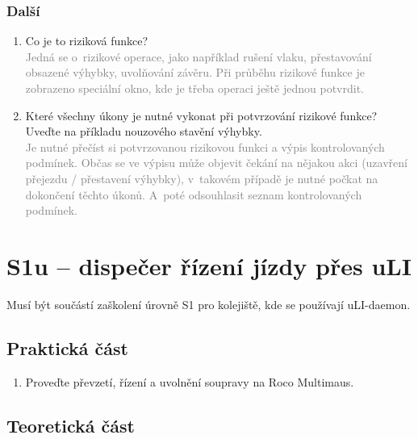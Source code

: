 \documentclass[12pt,a4paper]{article}
\newcommand{\solution}[1]{\\ \textcolor{gray}{#1}}
\newcommand{\solution}[1]{}
\begin{document}
\subsubsection*{Další}
\begin{enumerate}[leftmargin=*]
\item Co je to riziková funkce?
\solution{Jedná se o~rizikové operace, jako například rušení vlaku,
přestavování obsazené výhybky, uvolňování závěru. Při průběhu rizikové funkce
je zobrazeno speciální okno, kde je třeba operaci ještě jednou potvrdit.}

\item Které všechny úkony je nutné vykonat při potvrzování rizikové funkce?
Uveďte na příkladu nouzového stavění výhybky.
\solution{Je nutné přečíst si potvrzovanou rizikovou funkci a výpis
kontrolovaných podmínek. Občas se ve výpisu může objevit čekání na nějakou
akci (uzavření přejezdu / přestavení výhybky), v~takovém případě je nutné
počkat na dokončení těchto úkonů. A~poté odsouhlasit seznam kontrolovaných
podmínek.}

\end{enumerate}


\newpage
\section{S1u – dispečer řízení jízdy přes uLI}

Musí být součástí zaškolení úrovně S1 pro kolejiště, kde se používají
uLI-daemon.

\subsection{Praktická část}

\begin{enumerate}[leftmargin=*]
\item Proveďte převzetí, řízení a uvolnění soupravy na Roco Multimaus.
\end{enumerate}

\subsection{Teoretická část}
\end{document}
